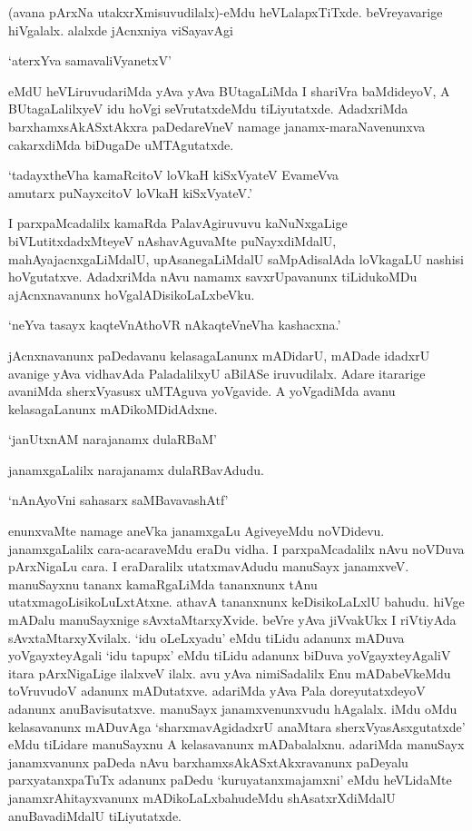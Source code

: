 (avana pArxNa utakxrXmisuvudilalx)-eMdu heVLalapxTiTxde. beVreyavarige hiVgalalx. alalxde jAcnxniya viSayavAgi

\begin{shloka}
`aterxYva samavaliVyanetxV'
\end{shloka}

\noindent eMdU heVLiruvudariMda yAva yAva BUtagaLiMda I shariVra baMdideyoV, A BUtagaLalilxyeV idu hoVgi seVrutatxdeMdu tiLiyutatxde. AdadxriMda barxhamxsAkASxtAkxra paDedareVneV namage janamx-maraNavenunxva cakarxdiMda biDugaDe uMTAgutatxde.

\begin{shloka}
`tadayxtheVha kamaRcitoV loVkaH kiSxVyateV EvameVva\\
amutarx puNayxcitoV loVkaH kiSxVyateV.'
\end{shloka}

I parxpaMcadalilx kamaRda PalavAgiruvuvu kaNuNxgaLige biVLutitxdadxMteyeV nAshavAguvaMte puNayxdiMdalU, mahAyajacnxgaLiMdalU, upAsanegaLiMdalU saMpAdisalAda loVkagaLU nashisi hoVgutatxve. AdadxriMda nAvu namamx savxrUpavanunx tiLidukoMDu ajAcnxnavanunx hoVgalADisikoLaLxbeVku.

\begin{shloka}
`neYva tasayx kaqteVnAthoVR nAkaqteVneVha kashacxna.'
\end{shloka}

jAcnxnavanunx paDedavanu kelasagaLanunx mADidarU, mADade idadxrU avanige yAva vidhavAda PaladalilxyU aBilASe iruvudilalx. Adare itararige avaniMda sherxVyasusx uMTAguva yoVgavide. A yoVgadiMda avanu kelasagaLanunx mADikoMDidAdxne.

\begin{shloka}
`janUtxnAM narajanamx dulaRBaM'
\end{shloka}

janamxgaLalilx narajanamx dulaRBavAdudu.

\begin{shloka}
`nAnAyoVni sahasarx saMBavavashAtf'
\end{shloka}

\noindent enunxvaMte namage aneVka janamxgaLu AgiveyeMdu noVDidevu. janamxgaLalilx cara-acaraveMdu eraDu vidha. I parxpaMcadalilx nAvu noVDuva pArxNigaLu cara. I eraDaralilx utatxmavAdudu manuSayx janamxveV. manuSayxnu tananx kamaRgaLiMda tananxnunx tAnu utatxmagoLisikoLuLxtAtxne. athavA tananxnunx keDisikoLaLxlU bahudu. hiVge mADalu manuSayxnige sAvxtaMtarxyXvide. beVre yAva jiVvakUkx I riVtiyAda sAvxtaMtarxyXvilalx. `idu oLeLxyadu' eMdu tiLidu adanunx mADuva yoVgayxteyAgali `idu tapupx' eMdu tiLidu adanunx biDuva yoVgayxteyAgaliV itara pArxNigaLige ilalxveV ilalx. avu yAva nimiSadalilx Enu mADabeVkeMdu toVruvudoV adanunx mADutatxve. adariMda yAva Pala doreyutatxdeyoV adanunx anuBavisutatxve. manuSayx janamxvenunxvudu hAgalalx. iMdu oMdu kelasavanunx mADuvAga `sharxmavAgidadxrU anaMtara sherxVyasAsxgutatxde' eMdu tiLidare manuSayxnu A kelasavanunx mADabalalxnu. adariMda manuSayx janamxvanunx paDeda nAvu barxhamxsAkASxtAkxravanunx paDeyalu parxyatanxpaTuTx adanunx paDedu `kuruyatanxmajamxni' eMdu heVLidaMte janamxrAhitayxvanunx mADikoLaLxbahudeMdu shAsatxrXdiMdalU anuBavadiMdalU tiLiyutatxde.

